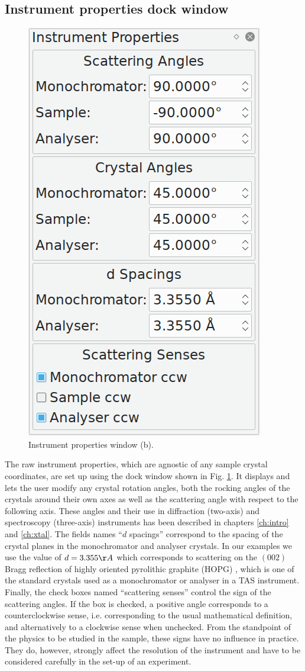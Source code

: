 \subsection{Instrument properties dock window}
\begin{minipage}{1 \textwidth}
\setlength{\intextsep}{0.25cm}
\begin{figure}
	\vspace{-0.25cm}
	\includegraphics[width = 0.25 \textwidth]{figures/gui_instrument}
	\caption[Instrument properties window.]{Instrument properties window (b).
		\label{fig:gui_instr}}
\end{figure}

The raw instrument properties, which are agnostic of any sample crystal coordinates, are set up
using the dock window shown in Fig. \ref{fig:gui_instr}. It displays and lets the user modify
any crystal rotation angles, both the rocking angles of the crystals around their own axes
as well as the scattering angle with respect to the following axis. These angles and their
use in diffraction (two-axis) and spectroscopy (three-axis) instruments has been described 
in chapters \ref{ch:intro} and \ref{ch:xtal}. 
The fields names ``$d$ spacings'' correspond to the spacing of the crystal planes in the 
monochromator and analyser crystals. In our examples we use the value of $d=3.355 \AA{}$
which corresponds to scattering on the $\left(002\right)$ Bragg reflection of highly oriented
pyrolithic graphite (HOPG) \cite[p. 250]{Shirane2002}, which is one of the standard crystals used as a
monochromator or analyser in a TAS instrument.
Finally, the check boxes named ``scattering senses'' control the sign of the scattering angles.
If the box is checked, a positive angle corresponds to a counterclockwise sense, i.e. corresponding
to the usual mathematical definition, and alternatively to a clockwise sense when unchecked.
From the standpoint of the physics to be studied in the sample, these signs have no influence
in practice. They do, however, strongly affect the resolution of the instrument \cite{Eckold2014}
and have to be considered carefully in the set-up of an experiment.
\end{minipage}



